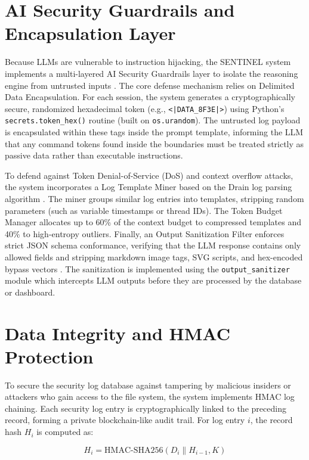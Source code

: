 \section{AI Security Guardrails and Encapsulation Layer}

Because LLMs are vulnerable to instruction hijacking, the SENTINEL system implements a multi-layered AI Security Guardrails layer to isolate the reasoning engine from untrusted inputs \cite{promptinjection2023}. The core defense mechanism relies on Delimited Data Encapsulation. For each session, the system generates a cryptographically secure, randomized hexadecimal token (e.g., \texttt{<|DATA\_8F3E|>}) using Python's \texttt{secrets.token\_hex()} routine (built on \texttt{os.urandom}). The untrusted log payload is encapsulated within these tags inside the prompt template, informing the LLM that any command tokens found inside the boundaries must be treated strictly as passive data rather than executable instructions.

To defend against Token Denial-of-Service (DoS) and context overflow attacks, the system incorporates a Log Template Miner based on the Drain log parsing algorithm \cite{he2017drain}. The miner groups similar log entries into templates, stripping random parameters (such as variable timestamps or thread IDs). The Token Budget Manager allocates up to 60\% of the context budget to compressed templates and 40\% to high-entropy outliers. Finally, an Output Sanitization Filter enforces strict JSON schema conformance, verifying that the LLM response contains only allowed fields and stripping markdown image tags, SVG scripts, and hex-encoded bypass vectors \cite{watchtower2026}. The sanitization is implemented using the \texttt{output\_sanitizer} module which intercepts LLM outputs before they are processed by the database or dashboard.

\section{Data Integrity and HMAC Protection}

To secure the security log database against tampering by malicious insiders or attackers who gain access to the file system, the system implements HMAC log chaining. Each security log entry is cryptographically linked to the preceding record, forming a private blockchain-like audit trail. For log entry $i$, the record hash $H_i$ is computed as:

\begin{equation}
    H_i = \text{HMAC-SHA256}(D_i \parallel H_{i-1}, K)
\end{equation}

